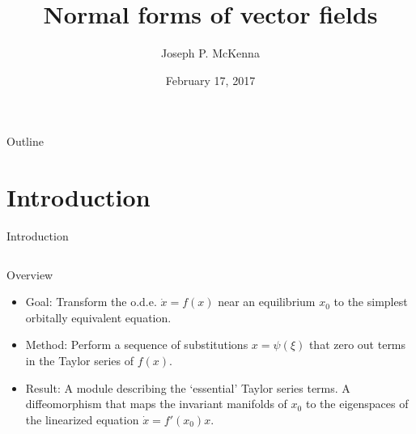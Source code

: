 \documentclass[10pt,T]{beamer}
\title[Normal Forms of ODEs]{Normal forms of vector fields}
\author[McKenna, Joseph P.]{Joseph P. McKenna}
\institute[Florida State University] 
{
  {\large Graduate Student Seminar}
}
\date[February 17, 2017]{February 17, 2017}
\begin{document}

%
%
%
%
\begin{frame}
\titlepage
\end{frame}

\begin{frame}{Outline}
\tableofcontents
\end{frame}

\section{Introduction}

\begin{frame}{Introduction}
\begin{columns}[T,onlytextwidth]	
\column{\textwidth}
\begin{block}{Overview}
\begin{itemize}
\item Goal: Transform the o.d.e. $\dot{x}=f(x)$ near an
  equilibrium $x_0$ to the simplest orbitally equivalent equation.\\[5mm]
\item Method: Perform a sequence of substitutions $x=\psi(\xi)$ that
  zero out terms in the Taylor series of $f(x)$.\\[5mm]
  \item Result: A module describing the `essential' Taylor series terms. A diffeomorphism that maps the
    invariant manifolds of $x_0$ to the eigenspaces of the linearized equation $\dot{x}=f'(x_0)x$.
\end{itemize}
\end{block}
\end{columns}
\end{frame}
\end{document}
